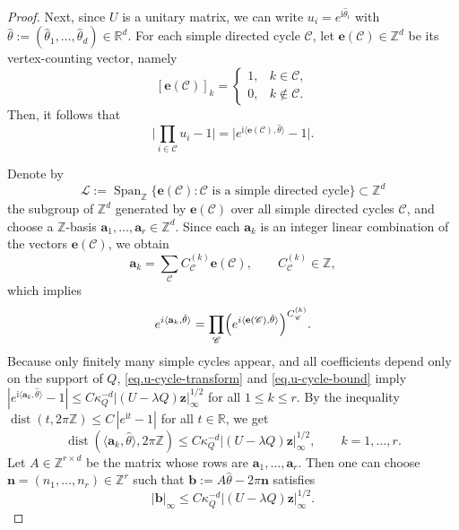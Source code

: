 \documentclass[11pt,twoside, a4paper]{article}
\numberwithin{equation}{section}
\numberwithin{figure}{section}
\theoremstyle{plain} %
\theoremstyle{definition}
\theoremstyle{remark}
\newcommand{\1} {\mspace{1 mu}}
\newcommand{\2} {\mspace{2 mu}}
\newcommand{\R} {\mathbb{R}}
\DeclareMathOperator{\dist}{dist}
\DeclareMathOperator{\spn}{Span}
\begin{document}
\begin{proof}
Next, since $U$ is a unitary matrix, we can write
$
u_i=e^{\mathrm i\hat\theta_i}
$ 
with
$\hat\theta:=(\hat\theta_1,\dots,\hat\theta_d)\in\mathbb R^d.
$
For each simple directed cycle $\mathscr{C}$, let $\mathbf{e}(\mathscr{C})\in\mathbb Z^d$ be its vertex-counting vector, namely
\[
[\mathbf{e}(\mathscr{C})]_k=
\begin{cases}
1,& k\in \mathscr{C},\\
0,& k\notin \mathscr{C}.
\end{cases}
\]
Then, it follows that
\begin{equation}\label{eq.u-cycle-transform}
  \Big|\prod_{i\in \mathscr{C}}u_i-1\Big|=\big| e^{\mathrm i\langle \mathbf{e}(\mathscr{C}),\hat\theta\rangle}-1\big|.
\end{equation}


Denote by 
\[
\mathscr{L}:=\spn_{\mathbb Z}\{\mathbf{e}(\mathscr{C}): \mathscr{C}\text{ is a simple directed cycle}\}\subset\mathbb Z^d
\]
the subgroup of $\mathbb{Z}^d$ generated by $\mathbf{e}(\mathscr{C})$ over all simple directed cycles $\mathscr{C}$, and choose a $\mathbb Z$-basis
$
\mathbf{a}_1,\dots,\mathbf{a}_r\in\mathbb Z^d.
$
Since each $\mathbf{a}_k$ is an integer linear combination of the vectors $\mathbf{e}(\mathscr{C})$, we obtain
\[
\mathbf{a}_k=\sum_{\mathscr{C}} C_{\mathscr{C}}^{(k)}\mathbf{e}(\mathscr{C}),
\qquad C_{\mathscr{C}}^{(k)}\in\mathbb Z,
\]
which implies
\[
e^{i\langle \mathbf{a}_k,\hat\theta\rangle}
=
\prod_{\mathscr{C}}\Bigl(e^{i\langle \mathbf{e}(\mathscr{C}),\hat\theta\rangle}\Bigr)^{C_{\mathscr{C}}^{(k)}}.
\]
Because only finitely many simple cycles appear, and all coefficients depend only on the support of $Q$, \eqref{eq.u-cycle-transform} and \eqref{eq.u-cycle-bound} imply
$
|e^{\mathrm i\langle \mathbf{a}_k,\hat\theta\rangle}-1|\le C\kappa_Q^{-d}|(U-\lambda Q)\mathbf z|_\infty^{1/2}
$ for all $1\le k\le r$.
By the inequality
$
\dist(t,2\pi\mathbb Z)\le C\,|e^{\mathrm it}-1|
$
for all $t\in\R$,
we get
\[
\dist(\langle \mathbf{a}_k,\hat\theta\rangle,2\pi\mathbb Z)\le C\kappa_Q^{-d}|(U-\lambda Q)\mathbf z|_\infty^{1/2},\qquad k=1,\dots,r.
\]
Let $A\in\mathbb Z^{r\times d}$ be the matrix whose rows are $\mathbf{a}_1,\dots,\mathbf{a}_r$.
Then one can choose $\mathbf{n}=(n_1,\dots,n_r)\in\mathbb Z^r$ such that
$
\mathbf{b}:=A\hat\theta-2\pi \mathbf{n}
$
satisfies
\begin{equation}\label{eq.b-bound}
  |\mathbf{b}|_\infty\le C\kappa_Q^{-d}|(U-\lambda Q)\mathbf z|_\infty^{1/2}.
\end{equation}



\end{proof}
\end{document}
